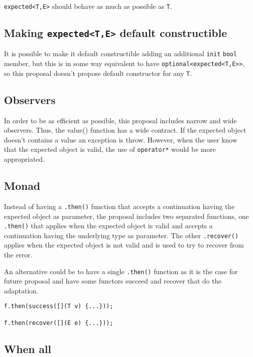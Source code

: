 \documentclass[a4paper,10pt]{article}
\newcommand{\cpp}[1]{\lstinline{#1}}
\begin{document}
\cpp{expected<T,E>} should behave as much as possible as \cpp{T}. 

\subsection{Making \cpp{expected<T,E>} default constructible}
It is possible to make it default constructible adding an additional \cpp{init} \cpp{bool} member, but this is in some way equivalent to have \cpp{optional<expected<T,E>>}, so this proposal doesn't propose default constructor for any \cpp{T}.

\subsection{Observers}

In order to be as efficient as possible, this proposal includes narrow and wide observers. Thus, the value() function has a wide contract. If the expected object doesn't contains a value an exception is throw. However, when the user know that the expected object is valid, the use of \cpp{operator*} would be more appropriated. 

\subsection{Monad}

Instead of having a \cpp{.then()} function that accepts a continuation having the expected object as parameter, the proposal includes two separated functions, one \cpp{.then()} that applies when the expected object is valid and accepts a continuation having the underlying type as parameter. The other \cpp{.recover()} applies when the expected object is not valid and is used to try to recover from the error.  

An alternative could be to have a single \cpp{.then()} function as it is the case for future proposal and have some functors succeed and recover that do the adaptation.

\begin{lstlisting}
f.then(success([](T v) {...}));

f.then(recover([](E e) {...}));
\end{lstlisting}

\subsection{When all}
\end{document}
